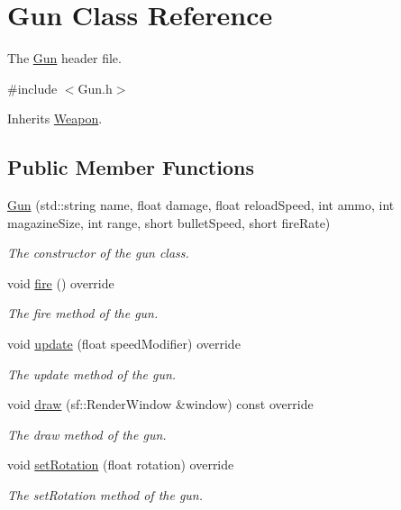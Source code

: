 \hypertarget{class_gun}{\section{Gun Class Reference}
\label{class_gun}
}


The \hyperlink{class_gun}{Gun} header file.  




{\ttfamily \#include $<$Gun.\+h$>$}



Inherits \hyperlink{class_weapon}{Weapon}.

\subsection*{Public Member Functions}
\begin{DoxyCompactItemize}
\item 
\hyperlink{class_gun_a9c018f8c08161908cc4a52f97ed00e0e}{Gun} (std\+::string name, float damage, float reload\+Speed, int ammo, int magazine\+Size, int range, short bullet\+Speed, short fire\+Rate)
\begin{DoxyCompactList}\small\item\em The constructor of the gun class. \end{DoxyCompactList}\item 
void \hyperlink{class_gun_a84fec52052e08f9d3d9546a873ea90e8}{fire} () override
\begin{DoxyCompactList}\small\item\em The fire method of the gun. \end{DoxyCompactList}\item 
void \hyperlink{class_gun_ae7cbc34b103c1e89b4536309582dafb5}{update} (float speed\+Modifier) override
\begin{DoxyCompactList}\small\item\em The update method of the gun. \end{DoxyCompactList}\item 
void \hyperlink{class_gun_a9f9c687cb43472691c14af52f508553a}{draw} (sf\+::\+Render\+Window \&window) const override
\begin{DoxyCompactList}\small\item\em The draw method of the gun. \end{DoxyCompactList}\item 
void \hyperlink{class_gun_a86d524a277e286ff34c5a57cc9c8c438}{set\+Rotation} (float rotation) override
\begin{DoxyCompactList}\small\item\em The set\+Rotation method of the gun. \end{DoxyCompactList}\item 

\end{DoxyCompactItemize}
